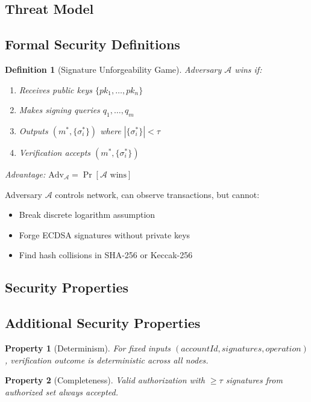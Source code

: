 \documentclass[10pt,twocolumn]{article}
\newtheorem{definition}{Definition}
\newtheorem{property}{Property}
\begin{document}
\subsection{Threat Model}

\subsection{Formal Security Definitions}

\begin{definition}[Signature Unforgeability Game]
Adversary $\mathcal{A}$ wins if:
\begin{enumerate}[leftmargin=*,topsep=2pt,itemsep=1pt]
\item Receives public keys $\{pk_1, \ldots, pk_n\}$
\item Makes signing queries $q_1, \ldots, q_m$
\item Outputs $(m^*, \{\sigma_i^*\})$ where $|\{\sigma_i^*\}| < \tau$
\item Verification accepts $(m^*, \{\sigma_i^*\})$
\end{enumerate}
Advantage: $\text{Adv}_{\mathcal{A}} = \Pr[\mathcal{A} \text{ wins}]$
\end{definition}


Adversary $\mathcal{A}$ controls network, can observe transactions, but cannot:
\begin{itemize}[leftmargin=*,topsep=2pt,itemsep=1pt]
\item Break discrete logarithm assumption
\item Forge ECDSA signatures without private keys
\item Find hash collisions in SHA-256 or Keccak-256
\end{itemize}

\subsection{Security Properties}

\subsection{Additional Security Properties}

\begin{property}[Determinism]
For fixed inputs $(accountId, signatures, operation)$, verification outcome is deterministic across all nodes.
\end{property}

\begin{property}[Completeness]
Valid authorization with $\geq \tau$ signatures from authorized set always accepted.
\end{property}
\end{document}
